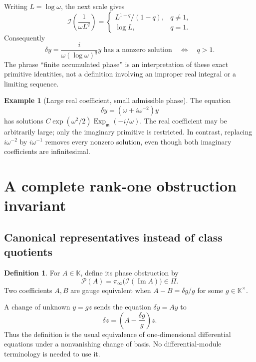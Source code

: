\documentclass[11pt,letterpaper]{article}
\numberwithin{equation}{section}
\theoremstyle{definition}
\newtheorem{definition}[theorem]{Definition}
\newtheorem{example}[theorem]{Example}
\theoremstyle{remark}
\newcommand{\K}{\mathbb K}
\newcommand{\mm}{\mathfrak m}
\newcommand{\PP}{\Pi}
\newcommand{\im}{\operatorname{Im}}
\newcommand{\Ex}{\operatorname{Exp}_{\mm}}
\newcommand{\Iop}{\mathcal I}
\newcommand{\Ob}{\mathcal P}
\begin{document}
Writing $L=\log\omega$, the next scale gives
\[
 \Iop\left(\frac{1}{\omega L^q}\right)=
 \begin{cases}
 L^{1-q}/(1-q),&q\ne1,\\
 \log L,&q=1.
 \end{cases}
\]
Consequently
\begin{equation}\label{eq:logthreshold}
 \delta y=\frac{i}{\omega(\log\omega)^q}y
 \text{ has a nonzero solution}
 \quad\Longleftrightarrow\quad q>1.
\end{equation}
The phrase ``finite accumulated phase'' is an interpretation of these exact primitive identities, not a definition involving an improper real integral or a limiting sequence.

\begin{example}[Large real coefficient, small admissible phase]
The equation
\[
 \delta y=(\omega+i\omega^{-2})y
\]
has solutions $C\exp(\omega^2/2)\Ex(-i/\omega)$. The real coefficient may be arbitrarily large; only the imaginary primitive is restricted. In contrast, replacing $i\omega^{-2}$ by $i\omega^{-1}$ removes every nonzero solution, even though both imaginary coefficients are infinitesimal.
\end{example}

\section{A complete rank-one obstruction invariant}\label{sec:gauge}

\subsection{Canonical representatives instead of class quotients}
\begin{definition}
For $A\in\K$, define its phase obstruction by
\begin{equation}\label{eq:obstruction}
 \Ob(A)=\pi_\infty\bigl(\Iop(\im A)\bigr)\in\PP.
\end{equation}
Two coefficients $A,B$ are gauge equivalent when $A-B=\delta g/g$ for some $g\in\K^\times$.
\end{definition}
A change of unknown $y=gz$ sends the equation $\delta y=Ay$ to
\[
 \delta z=\left(A-\frac{\delta g}{g}\right)z.
\]
Thus the definition is the usual equivalence of one-dimensional differential equations under a nonvanishing change of basis. No differential-module terminology is needed to use it.
\end{document}
